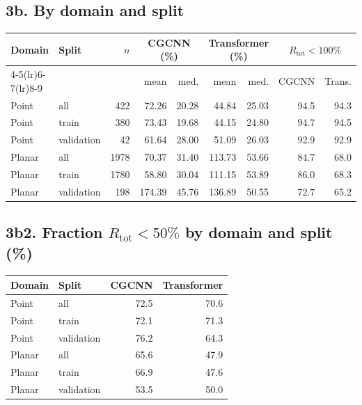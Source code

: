 \documentclass[11pt,a4paper]{article}
\begin{document}
\subsection*{3b. By domain and split}

\begin{center}
\footnotesize
\setlength{\tabcolsep}{4pt}
\begin{tabular}{llr rr rr rr}
  \toprule
  Domain & Split & $n$ &
  \multicolumn{2}{c}{CGCNN (\%)} &
  \multicolumn{2}{c}{Transformer (\%)} &
  \multicolumn{2}{c}{$R_{\mathrm{tot}}<100\%$} \\
  \cmidrule(lr){4-5}\cmidrule(lr){6-7}\cmidrule(lr){8-9}
  & & & mean & med. & mean & med. & CGCNN & Trans. \\
  \midrule
  Point  & all        & 422 & 72.26 & 20.28 &  44.84 &  25.03 & 94.5 & 94.3 \\
  Point  & train      & 380 & 73.43 & 19.68 &  44.15 &  24.80 & 94.7 & 94.5 \\
  Point  & validation &  42 & 61.64 & 28.00 &  51.09 &  26.03 & 92.9 & 92.9 \\
  Planar & all        & 1978 & 70.37 & 31.40 & 113.73 &  53.66 & 84.7 & 68.0 \\
  Planar & train      & 1780 & 58.80 & 30.04 & 111.15 &  53.89 & 86.0 & 68.3 \\
  Planar & validation &  198 & 174.39 & 45.76 & 136.89 &  50.55 & 72.7 & 65.2 \\
  \bottomrule
\end{tabular}
\end{center}

\subsection*{3b2. Fraction $R_{\mathrm{tot}}<50\%$ by domain and split (\%)}

\begin{center}
\small
\begin{tabular}{llrr}
  \toprule
  Domain & Split & CGCNN & Transformer \\
  \midrule
  Point  & all        & 72.5 & 70.6 \\
  Point  & train      & 72.1 & 71.3 \\
  Point  & validation & 76.2 & 64.3 \\
  Planar & all        & 65.6 & 47.9 \\
  Planar & train      & 66.9 & 47.6 \\
  Planar & validation & 53.5 & 50.0 \\
  \bottomrule
\end{tabular}
\end{center}
\end{document}
